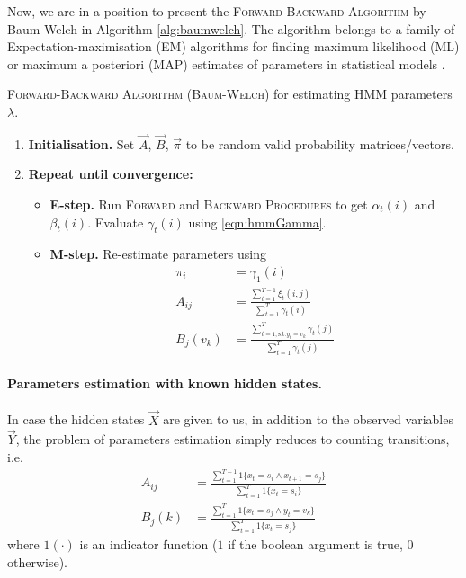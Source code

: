 Now, we are in a position to present the \textsc{Forward-Backward Algorithm} by Baum-Welch in Algorithm \ref{alg:baumwelch}. The algorithm belongs to a family of Expectation-maximisation (EM) algorithms for finding maximum likelihood (ML) or maximum a posteriori (MAP) estimates of parameters in statistical models \cite{wiki:EM}.
\begin{algorithm}
	\caption{\textsc{Forward-Backward Algorithm (Baum-Welch)} for estimating HMM parameters $\lambda$.}
	\label{alg:baumwelch}
	\begin{enumerate}
		\item
			\textbf{Initialisation.}
			Set $\vec A$, $\vec B$, $\vec \pi$ to be random valid probability matrices/vectors.
		\item
			\textbf{Repeat until convergence:}
			\begin{itemize}
				\item \textbf{E-step.} Run \textsc{Forward} and \textsc{Backward Procedures} to get $\alpha_t(i)$ and $\beta_t(i)$. Evaluate $\gamma_t(i)$ using \eqref{eqn:hmmGamma}.
				\item \textbf{M-step.} Re-estimate parameters using
				\begin{align*}
					\pi_i & = \gamma_1(i) \\
					A_{ij} & = \frac{\sum_{t = 1}^{T - 1} \xi_t(i, j)}{\sum_{t = 1}^T \gamma_t(i)} \\
					B_j(v_k) & = \frac{\sum_{t = 1, \text{s.t.} y_t = v_k}^T \gamma_t(j)}{\sum_{t = 1}^T \gamma_t(j)}
				\end{align*}
			\end{itemize}
	\end{enumerate}
\end{algorithm}

\paragraph{Parameters estimation with known hidden states.} In case the hidden states $\vec X$ are given to us, in addition to the observed variables $\vec Y$, the problem of parameters estimation simply reduces to counting transitions, i.e.
	\begin{align}
		A_{ij} & = \frac{\sum_{t = 1}^{T - 1} 1\{x_t = s_i \land x_{t + 1} = s_j\}}{\sum_{t = 1}^{T} 1\{x_t = s_i\}} \\
		B_j(k) & = \frac{\sum_{t = 1}^T 1\{x_t = s_j \land y_t = v_k\}}{\sum_{t = 1}^{T} 1\{x_t = s_j\}}
	\end{align}
where $1(\cdot)$ is an indicator function ($1$ if the boolean argument is true, $0$ otherwise).

